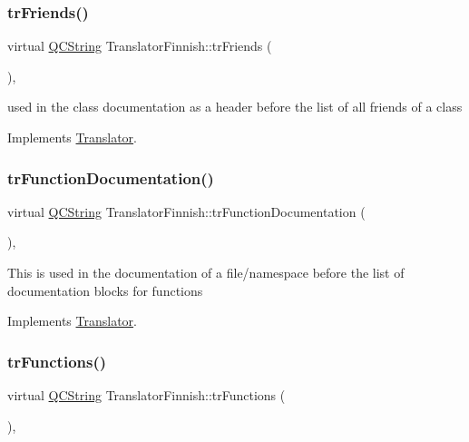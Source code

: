 \subsubsection{\texorpdfstring{trFriends()}{trFriends()}}
{\footnotesize\ttfamily virtual \mbox{\hyperlink{class_q_c_string}{Q\+C\+String}} Translator\+Finnish\+::tr\+Friends (\begin{DoxyParamCaption}{ }\end{DoxyParamCaption})\hspace{0.3cm}{\ttfamily [inline]}, {\ttfamily [virtual]}}

used in the class documentation as a header before the list of all friends of a class 

Implements \mbox{\hyperlink{class_translator}{Translator}}.

\mbox{\label{class_translator_finnish_ac51819db3b62ccc5a782819196ac34a9}} 
\subsubsection{\texorpdfstring{trFunctionDocumentation()}{trFunctionDocumentation()}}
{\footnotesize\ttfamily virtual \mbox{\hyperlink{class_q_c_string}{Q\+C\+String}} Translator\+Finnish\+::tr\+Function\+Documentation (\begin{DoxyParamCaption}{ }\end{DoxyParamCaption})\hspace{0.3cm}{\ttfamily [inline]}, {\ttfamily [virtual]}}

This is used in the documentation of a file/namespace before the list of documentation blocks for functions 

Implements \mbox{\hyperlink{class_translator}{Translator}}.

\mbox{\label{class_translator_finnish_ad940857913a231fb4f54f641f9ade1bf}} 
\subsubsection{\texorpdfstring{trFunctions()}{trFunctions()}}
{\footnotesize\ttfamily virtual \mbox{\hyperlink{class_q_c_string}{Q\+C\+String}} Translator\+Finnish\+::tr\+Functions (\begin{DoxyParamCaption}{ }\end{DoxyParamCaption})\hspace{0.3cm}{\ttfamily [inline]}, {\ttfamily [virtual]}}

